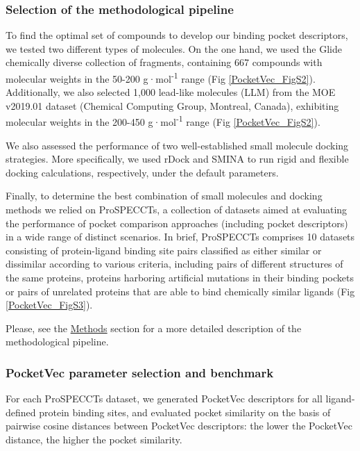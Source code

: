 \subsubsection{Selection of the methodological pipeline}

To find the optimal set of compounds to develop our binding pocket descriptors, we tested two different types of molecules. On the one hand, we used the Glide chemically diverse collection of fragments\cite{friesner_glide_2004, halgren_glide_2004}, containing 667 compounds with molecular weights in the 50-200 g·mol\textsuperscript{-1} range (Fig \ref{PocketVec_FigS2}). Additionally, we also selected 1,000 lead-like molecules (LLM) from the MOE v2019.01 dataset (Chemical Computing Group, Montreal, Canada), exhibiting molecular weights in the 200-450 g·mol\textsuperscript{-1} range (Fig \ref{PocketVec_FigS2}).

We also assessed the performance of two well-established small molecule docking strategies. More specifically, we used rDock\cite{ruiz-carmona_rdock_2014} and SMINA\cite{koes_lessons_2013} to run rigid and flexible docking calculations, respectively, under the default parameters.

Finally, to determine the best combination of small molecules and docking methods we relied on ProSPECCTs, a collection of datasets aimed at evaluating the performance of pocket comparison approaches (including pocket descriptors) in a wide range of distinct scenarios\cite{ehrt_benchmark_2018}. In brief, ProSPECCTs comprises 10 datasets consisting of protein-ligand binding site pairs classified as either similar or dissimilar according to various criteria, including pairs of different structures of the same proteins, proteins harboring artificial mutations in their binding pockets or pairs of unrelated proteins that are able to bind chemically similar ligands (Fig \ref{PocketVec_FigS3}).

Please, see the \hyperref[PocketVec_Methods]{Methods} section for a more detailed description of the methodological pipeline.


\subsubsection{PocketVec parameter selection and benchmark}

For each ProSPECCTs dataset, we generated PocketVec descriptors for all ligand-defined protein binding sites, and evaluated pocket similarity on the basis of pairwise cosine distances between PocketVec descriptors: the lower the PocketVec distance, the higher the pocket similarity. 

